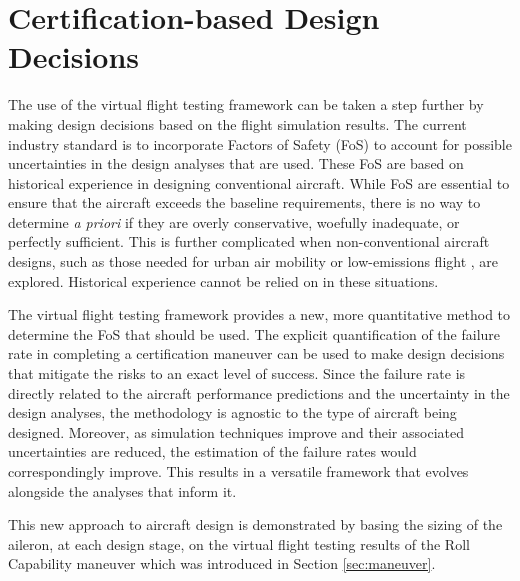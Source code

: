 \section{Certification-based Design Decisions}

The use of the virtual flight testing framework can be taken a step further by making design decisions based on the flight simulation results. 
The current industry standard is to incorporate Factors of Safety (FoS) to account for possible uncertainties in the design analyses that are used.
These FoS are based on historical experience in designing conventional aircraft. 
While FoS are essential to ensure that the aircraft exceeds the baseline requirements, there is no way to determine \textit{a priori} if they are overly conservative, woefully inadequate, or perfectly sufficient. 
This is further complicated when non-conventional aircraft designs, such as those needed for urban air mobility \cite{silva_vtol_2018} or low-emissions flight \cite{bruner_nasa_2010}, are explored.
Historical experience cannot be relied on in these situations. 

The virtual flight testing framework provides a new, more quantitative method to determine the FoS that should be used.
The explicit quantification of the failure rate in completing a certification maneuver can be used to make design decisions that mitigate the risks to an exact level of success.
Since the failure rate is directly related to the aircraft performance predictions and the uncertainty in the design analyses, the methodology is agnostic to the type of aircraft being designed. 
Moreover, as simulation techniques improve and their associated uncertainties are reduced, the estimation of the failure rates would correspondingly improve. 
This results in a versatile framework that evolves alongside the analyses that inform it. 

This new approach to aircraft design is demonstrated by basing the sizing of the aileron, at each design stage, on the virtual flight testing results of the Roll Capability maneuver which was introduced in Section \ref{sec:maneuver}.
